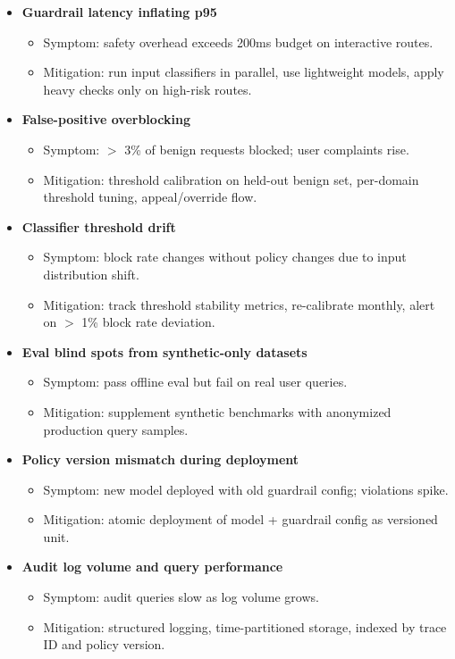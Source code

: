\begin{itemize}
  \item \textbf{Guardrail latency inflating p95}
  \begin{itemize}
    \item Symptom: safety overhead exceeds 200ms budget on interactive routes.
    \item Mitigation: run input classifiers in parallel, use lightweight models, apply heavy checks only on high-risk routes.
  \end{itemize}

  \item \textbf{False-positive overblocking}
  \begin{itemize}
    \item Symptom: $>$ 3\% of benign requests blocked; user complaints rise.
    \item Mitigation: threshold calibration on held-out benign set, per-domain threshold tuning, appeal/override flow.
  \end{itemize}

  \item \textbf{Classifier threshold drift}
  \begin{itemize}
    \item Symptom: block rate changes without policy changes due to input distribution shift.
    \item Mitigation: track threshold stability metrics, re-calibrate monthly, alert on $>$ 1\% block rate deviation.
  \end{itemize}

  \item \textbf{Eval blind spots from synthetic-only datasets}
  \begin{itemize}
    \item Symptom: pass offline eval but fail on real user queries.
    \item Mitigation: supplement synthetic benchmarks with anonymized production query samples.
  \end{itemize}

  \item \textbf{Policy version mismatch during deployment}
  \begin{itemize}
    \item Symptom: new model deployed with old guardrail config; violations spike.
    \item Mitigation: atomic deployment of model + guardrail config as versioned unit.
  \end{itemize}

  \item \textbf{Audit log volume and query performance}
  \begin{itemize}
    \item Symptom: audit queries slow as log volume grows.
    \item Mitigation: structured logging, time-partitioned storage, indexed by trace ID and policy version.
  \end{itemize}
\end{itemize}

